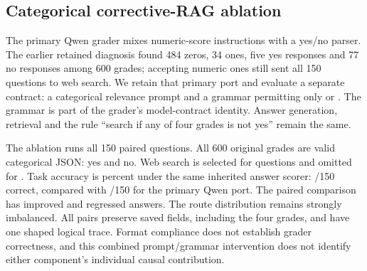\subsection{Categorical corrective-RAG ablation}

The primary Qwen grader mixes numeric-score instructions with a yes/no parser.
The earlier retained diagnosis found 484 zeros, 34 ones, five yes responses and
77 no responses among 600 grades; accepting numeric ones still sent all 150
questions to web search. We retain that primary port and evaluate a separate
contract: a categorical relevance prompt and a grammar permitting only
 or . The grammar is part
of the grader's model-contract identity. Answer generation, retrieval and the
rule ``search if any of four grades is not yes'' remain the same.

The ablation runs all 150 paired questions. All 600 original grades are valid
categorical JSON: \categoricalYes{} yes and \categoricalNo{} no. Web search is
selected for \categoricalSearch{} questions and omitted for
\categoricalNoSearch{}. Task accuracy is \categoricalTask{} percent under the
same inherited answer scorer: \categoricalCorrect{}/150 correct, compared with
\categoricalPrimaryCorrect{}/150 for the primary Qwen port. The paired comparison
has \categoricalImproved{} improved and \categoricalRegressed{} regressed answers.
The route distribution remains strongly imbalanced. All pairs preserve saved
fields, including the four grades, and have one shaped logical trace. Format compliance does not
establish grader correctness, and this combined prompt/grammar intervention
does not identify either component's individual causal contribution.
